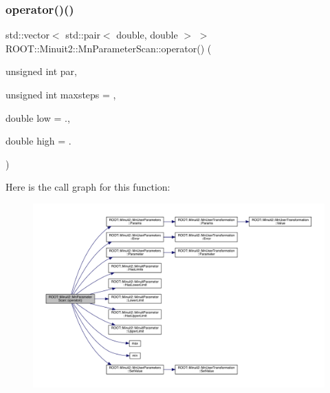\mbox{\label{classROOT_1_1Minuit2_1_1MnParameterScan_a2548238382446f4774d43a4269dcebcf}} 
\subsubsection{\texorpdfstring{operator()()}{operator()()}\hspace{0.1cm}{\footnotesize\ttfamily [3/3]}}
{\footnotesize\ttfamily std\+::vector$<$ std\+::pair$<$ double, double $>$ $>$ R\+O\+O\+T\+::\+Minuit2\+::\+Mn\+Parameter\+Scan\+::operator() (\begin{DoxyParamCaption}\item[{unsigned int}]{par,  }\item[{unsigned int}]{maxsteps = {},  }\item[{double}]{low = {.},  }\item[{double}]{high = {.} }\end{DoxyParamCaption})}

Here is the call graph for this function\+:
\nopagebreak
\begin{figure}[H]
\begin{center}
\leavevmode
\includegraphics[width=350pt]{da/d9e/classROOT_1_1Minuit2_1_1MnParameterScan_a2548238382446f4774d43a4269dcebcf_cgraph}
\end{center}
\end{figure}
\mbox{\label{classROOT_1_1Minuit2_1_1MnParameterScan_aacca13f3ec5fe5acd706dee93edb56d4}} 
